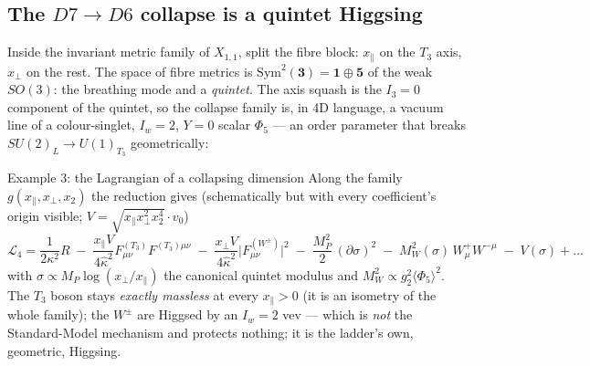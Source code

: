 \documentclass[11pt]{article}
\newcommand{\X}{X_{1,1}}
\newcommand{\Iw}{I_w}
\begin{document}
\subsection{The $D7\to D6$ collapse is a quintet Higgsing}

Inside the invariant metric family of $\X$, split the fibre block:
$x_\parallel$ on the $T_3$ axis, $x_\perp$ on the rest. The space of fibre metrics is
$\mathrm{Sym}^2(\mathbf 3)=\mathbf 1\oplus\mathbf 5$ of the weak $SO(3)$: the breathing mode
and a \emph{quintet}. The axis squash is the $I_3=0$ component of the quintet, so the
collapse family is, in 4D language, a vacuum line of a colour-singlet, $\Iw=2$, $Y=0$ scalar
$\Phi_5$ --- an order parameter that breaks $SU(2)_L\to U(1)_{T_3}$ geometrically:

\begin{examplebox}{Example 3: the Lagrangian of a collapsing dimension}
Along the family $g(x_\parallel,x_\perp,x_2)$ the reduction gives (schematically but with
every coefficient's origin visible; $V=\sqrt{x_\parallel x_\perp^2 x_2^4}\cdot v_0$)
\[
\mathcal L_4 = \frac{1}{2\kappa^2}R
\;-\;\frac{x_\parallel V}{4\hat\kappa^2} F^{(T_3)}_{\mu\nu}F^{(T_3)\mu\nu}
\;-\;\frac{x_\perp V}{4\hat\kappa^2}\big|F^{(W^\pm)}_{\mu\nu}\big|^2
\;-\;\frac{M_P^2}{2}\,(\partial\sigma)^2
\;-\;M_W^2(\sigma)\,W^+_\mu W^{-\mu}\;-\;V(\sigma)+\dots
\]
with $\sigma \propto M_P\log(x_\perp/x_\parallel)$ the canonical quintet modulus and
$M_W^2 \propto g_2^2\langle\Phi_5\rangle^2$. The $T_3$ boson stays \emph{exactly massless}
at every $x_\parallel>0$ (it is an isometry of the whole family); the $W^\pm$ are Higgsed by
an $I_w=2$ vev --- which is \emph{not} the Standard-Model mechanism and protects nothing; it
is the ladder's own, geometric, Higgsing.
\end{examplebox}
\end{document}
